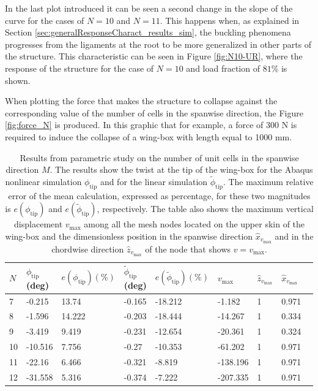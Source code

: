     In the last plot introduced it can be seen a second change in the slope of the curve for the cases of $N = 10$ and $N = 11$. This happens when, as explained in Section \ref{sec:generalResponseCharact_results_sim}, the buckling phenomena progresses from the ligaments at the root to be more generalized in other parts of the structure. This characteristic can be seen in Figure \ref{fig:N10-UR}, where the response of the structure for the case of $N = 10$ and load fraction of $81\%$ is shown.

    When plotting the force that makes the structure to collapse against the corresponding value of the number of cells in the spanwise direction, the Figure \ref{fig:force_N} is produced. In this graphic that for example, a force of 300 N is required to induce the collapse of a wing-box with length equal to 1000 mm.

    \begin{table}[!htpb] %
      \centering
      \begin{tabular}{|l|l|l|l|l|l|l|l|l|}
      \hline
      $N$ & $\phi_{\mathrm{tip}}$ (deg) & $e(\phi_{\mathrm{tip}}) (\%)$ & $\tilde{\phi}_{\mathrm{tip}}$ (deg) & $e(\tilde{\phi}_{\mathrm{tip}}) (\%)$ & $v_{\mathrm{max}}$ & $\hat{z}_{v_{\mathrm{max}}}$ & $\hat{x}_{v_{\mathrm{max}}}$ \\ \hline
      7 & -0.215 & 13.74 & -0.165 & -18.212 & -1.182 & 1 & 0.971 \\ \hline
      8 & -1.596 & 14.222 & -0.203 & -18.444 & -14.267 & 1 & 0.334 \\ \hline
      9 & -3.419 & 9.419 & -0.231 & -12.654 & -20.361 & 1 & 0.324 \\ \hline
      10 & -10.516 & 7.756 & -0.27 & -10.353 & -61.202 & 1 & 0.971 \\ \hline
      11 & -22.16 & 6.466 & -0.321 & -8.819 & -138.196 & 1 & 0.971 \\ \hline
      12 & -31.558 & 5.316 & -0.374 & -7.222 & -207.335 & 1 & 0.971 \\ \hline
      \end{tabular}
      \caption[Results from parametric study on the number of unit cells in the spanwise direction]{Results from parametric study on the number of unit cells in the spanwise direction $M$. The results show the twist at the tip of the wing-box for the Abaqus nonlinear simulation $\phi_{\mathrm{tip}}$ and for the linear simulation $\tilde{\phi}_{\mathrm{tip}}$. The maximum relative error of the mean calculation, expressed as percentage, for these two magnitudes is $e(\phi_{\mathrm{tip}})$ and $e(\tilde{\phi}_{\mathrm{tip}})$, respectively. The table also shows the maximum vertical displacement $v_{\mathrm{max}}$ among all the mesh nodes located on the upper skin of the wing-box and the dimensionless position in the spanwise direction $\hat{x}_{v_{\mathrm{max}}}$ and in the chordwise direction $\hat{z}_{v_{\mathrm{max}}}$ of the node that shows $v = v_{\mathrm{max}}$.}
      \label{tab:para_N}
    \end{table}


